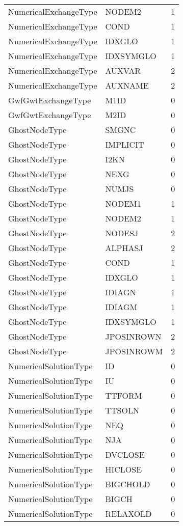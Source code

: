 \begin{longtable}{p{6cm} p{4cm} p{2cm} }
NumericalExchangeType &  NODEM2 & 1 \\ 
NumericalExchangeType &  COND & 1 \\ 
NumericalExchangeType &  IDXGLO & 1 \\ 
NumericalExchangeType &  IDXSYMGLO & 1 \\ 
NumericalExchangeType &  AUXVAR & 2 \\ 
NumericalExchangeType & AUXNAME & 2 \\ 
GwfGwtExchangeType &  M1ID & 0 \\ 
GwfGwtExchangeType &  M2ID & 0 \\ 
GhostNodeType &  SMGNC & 0 \\ 
GhostNodeType &  IMPLICIT & 0 \\ 
GhostNodeType &  I2KN & 0 \\ 
GhostNodeType &  NEXG & 0 \\ 
GhostNodeType &  NUMJS & 0 \\ 
GhostNodeType &  NODEM1 & 1 \\ 
GhostNodeType &  NODEM2 & 1 \\ 
GhostNodeType &  NODESJ & 2 \\ 
GhostNodeType &  ALPHASJ & 2 \\ 
GhostNodeType &  COND & 1 \\ 
GhostNodeType &  IDXGLO & 1 \\ 
GhostNodeType &  IDIAGN & 1 \\ 
GhostNodeType &  IDIAGM & 1 \\ 
GhostNodeType &  IDXSYMGLO & 1 \\ 
GhostNodeType &  JPOSINROWN & 2 \\ 
GhostNodeType &  JPOSINROWM & 2 \\ 
NumericalSolutionType &  ID & 0 \\ 
NumericalSolutionType &  IU & 0 \\ 
NumericalSolutionType &  TTFORM & 0 \\ 
NumericalSolutionType &  TTSOLN & 0 \\ 
NumericalSolutionType &  NEQ & 0 \\ 
NumericalSolutionType &  NJA & 0 \\ 
NumericalSolutionType &  DVCLOSE & 0 \\ 
NumericalSolutionType &  HICLOSE & 0 \\ 
NumericalSolutionType &  BIGCHOLD & 0 \\ 
NumericalSolutionType &  BIGCH & 0 \\ 
NumericalSolutionType &  RELAXOLD & 0 \\ 

\end{longtable}
